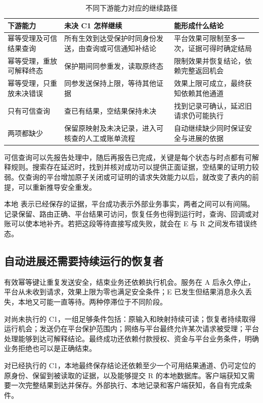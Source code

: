 \begin{table}[htbp]
\centering\small
\caption{不同下游能力对应的继续路径}\label{tab:ch07-capabilities}
\begin{tabularx}{\linewidth}{@{}p{3.1cm}XX@{}}
\toprule
下游能力 & 未决 C1 怎样继续 & 能形成什么结论\\
\midrule
幂等受理及可信结果查询 & 所有生效到达受保护时同身份发送，由查询或可信通知补结论 & 平台效果可限制至多一次，证据可得时确定结局\\
幂等受理，重放可解释终态 & 保护期间同参重发，读取原终态 & 限制效果并恢复结论，依赖完整返回机会\\
幂等受理，只重放未决错误 & 同参发送保持上限，等待其他证据 & 效果上限可成立，最终获知依赖其他通道\\
只有可信查询 & 查已有结果，空结果保持未决 & 找到记录可确认，延迟旧请求仍可能执行\\
两项都缺少 & 保留原映射及未决记录，进入可核查的人工或账单流程 & 自动继续缺少同时保证安全与进展的依据\\
\bottomrule
\end{tabularx}
\end{table}

可信查询可以先报告处理中，随后再报告已完成，关键是每个状态与时点都有可解释规则。搜索存在延迟时，找到并核对成功可以提供正面证据，空结果的证明力较弱。仅查询的平台增加原子关闭或可证明的请求失效能力以后，就改变了表内的前提，可以重新推导安全重发。

本地  表示已经保存的证据，平台成功表示外部业务事实，两者之间可以有间隔。记录保留、路由正确、平台结果可访问，恢复任务也得到运行时，查询、回调或对账可以使本地补齐。若把这段等待直接写成失败，就会在 E 与 R 之间发布错误终态。

\clearpage
\subsection*{自动进展还需要持续运行的恢复者}

有效幂等键让重复发送安全，结束业务还依赖执行机会。服务在 A 后永久停止，平台从未收到请求，效果上限为零也满足安全条件；E 已发生但结果消息永久丢失，本地又可能一直等待。两种停滞位于不同阶段。

对尚未执行的 C1，一组足够条件包括：原输入和映射持续可读；恢复者持续取得运行机会；发送仍在平台保护范围内；网络与平台最终允许某次请求被受理；平台处理能够到达可解释结论。最终成功还依赖付款授权、资金与平台业务条件，明确业务拒绝也可以是正确结束。

对已经执行的 C1，本地最终保存结论还依赖至少一个可用结果通道、仍可定位的原身份、保留到被读取的证据，以及能够提交 R 的本地数据库。客户端获知又需要一次完整结果到达并保存。外部执行、本地记录和客户端获知，各自有完成条件。

